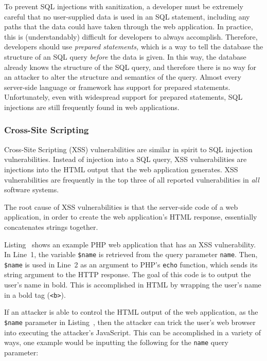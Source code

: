 To prevent SQL injections with sanitization, a developer must be
extremely careful that no user-supplied data is used in an SQL
statement, including any paths that the data could have taken through
the web application. In practice, this is (understandably) difficult
for developers to always accomplish. Therefore, developers should use
\emph{prepared statements,} which is a way to tell the database the
structure of an SQL query \emph{before} the data is given. In this
way, the database already knows the structure of the SQL query, and
therefore there is no way for an attacker to alter the structure and
semantics of the query. Almost every server-side language or framework
has support for prepared statements. Unfortunately, even with
widespread support for prepared statements, SQL injections are still
frequently found in web applications.

\subsubsection{Cross-Site Scripting}

Cross-Site Scripting (XSS) vulnerabilities are similar in spirit to
SQL injection vulnerabilities. Instead of injection into a SQL
query, XSS vulnerabilities are injections into the HTML output that
the web application generates. XSS vulnerabilities are frequently in
the top three of all reported vulnerabilities in \emph{all} software
systems.

The root cause of XSS vulnerabilities is that the server-side code of
a web application, in order to create the web application's HTML
response, essentially concatenates strings together.



Listing~ shows an example PHP web application
that has an XSS vulnerability. In Line~1, the variable \texttt{\$name}
is retrieved from the query parameter \texttt{name}. Then,
\texttt{\$name} is used in Line~2 as an argument to PHP's
\texttt{echo} function, which sends its string argument to the HTTP
response. The goal of this code is to output the user's name in bold.
This is accomplished in HTML by wrapping the user's name in a bold tag
(\texttt{<b>}).

If an attacker is able to control the HTML output of the web
application, as the \texttt{\$name} parameter in
Listing~, then the attacker can trick the user's
web browser into executing the attacker's JavaScript. This can be
accomplished in a variety of ways, one example would be inputting the
following for the \texttt{name} query parameter:


